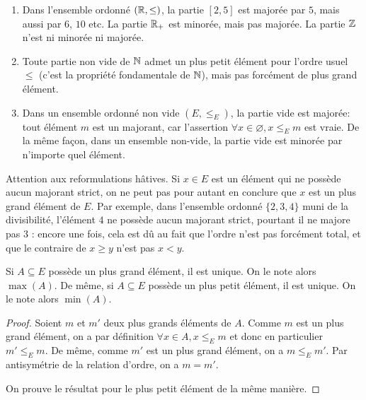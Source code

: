 \begin{exemple}
\begin{enumerate}[label=\alph*)]
\item Dans l'ensemble ordonné $(\mathbb{R},\leq)$, la partie $[2,5]$ est majorée par $5$, mais aussi par $6$, $10$ etc. La partie $\mathbb{R}_+$ est minorée, mais pas majorée. La partie $\mathbb{Z}$ n'est ni minorée ni majorée.
\item Toute partie non vide de $\mathbb{N}$ admet un plus petit élément pour l'ordre usuel $\leq$ (c'est la propriété fondamentale de $\mathbb{N}$), mais pas forcément de plus grand élément.
\item Dans un ensemble ordonné non vide $(E,\leq_E)$, la partie vide est majorée: tout élément $m$ est un majorant, car l'assertion $\forall x\in \varnothing, x\leq_E m$ est vraie. De la même façon, dans un ensemble non-vide, la partie vide est minorée par n'importe quel élément.
\end{enumerate}
\end{exemple}

\begin{remarque}
Attention aux reformulations hâtives. Si $x\in E$ est un élément qui ne possède aucun majorant strict, on ne peut pas pour autant en conclure que $x$ est un plus grand élément de $E$. Par exemple, dans l'ensemble ordonné $\{2,3,4\}$ muni de la divisibilité, l'élément $4$ ne possède aucun majorant strict, pourtant il ne majore pas $3$ : encore une fois, cela est dû au fait que l'ordre n'est pas forcément total, et que le contraire de $x\geq y$ n'est pas $x<y$.
\end{remarque}



\begin{proposition}
Si $A\subseteq E$ possède un plus grand élément, il est unique. On le note alors $\max(A)$.
De même, si $A\subseteq E$ possède un plus petit élément, il est unique. On le note alors $\min(A)$.
\end{proposition}
\begin{proof}
Soient $m$ et $m'$ deux plus grands éléments de $A$. Comme $m$ est un plus grand élément, on a par définition $\forall x\in A, x\leq_E m$ et donc en particulier $m'\leq_E m$. De même, comme $m'$ est un plus grand élément, on a $m\leq_E m'$. Par antisymétrie de la relation d'ordre, on a $m=m'$.

On prouve le résultat pour le plus petit élément de la même manière.
\end{proof}


